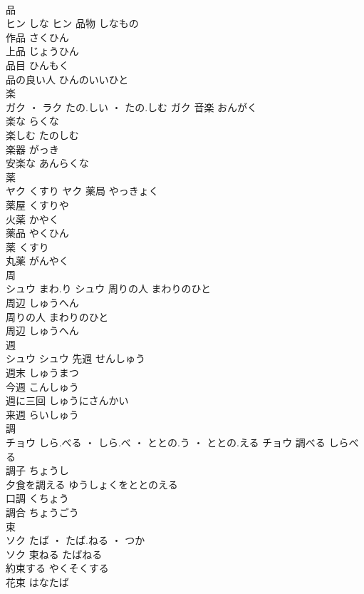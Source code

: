 \documentclass[8pt]{extreport}
\begin{document}
\begin{CJK}{UTF8}{min}
\\	品	
\\	ヒン	しな	ヒン	品物	しなもの	
\\	作品	さくひん	
\\	上品	じょうひん	
\\	品目	ひんもく	
\\	品の良い人	ひんのいいひと	
\\	楽	
\\	ガク ・ ラク	たの.しい ・ たの.しむ	ガク	音楽	おんがく	
\\	楽な	らくな	
\\	楽しむ	たのしむ	
\\	楽器	がっき	
\\	安楽な	あんらくな	
\\	薬	
\\	ヤク	くすり	ヤク	薬局	やっきょく	
\\	薬屋	くすりや	
\\	火薬	かやく	
\\	薬品	やくひん	
\\	薬	くすり	
\\	丸薬	がんやく	
\\	周	
\\	シュウ	まわ.り	シュウ	周りの人	まわりのひと	
\\	周辺	しゅうへん	
\\	周りの人	まわりのひと	
\\	周辺	しゅうへん	
\\	週	
\\	シュウ		シュウ	先週	せんしゅう	
\\	週末	しゅうまつ	
\\	今週	こんしゅう	
\\	週に三回	しゅうにさんかい	
\\	来週	らいしゅう	
\\	調	
\\	チョウ	しら.べる ・ しら.べ ・ ととの.う ・ ととの.える	チョウ	調べる	しらべる	
\\	調子	ちょうし	
\\	夕食を調える	ゆうしょくをととのえる	
\\	口調	くちょう	
\\	調合	ちょうごう	
\\	束	
\\	ソク	たば ・ たば.ねる ・ つか
\\	ソク	束ねる	たばねる	
\\	約束する	やくそくする	
\\	花束	はなたば	

\end{CJK}
\end{document}
